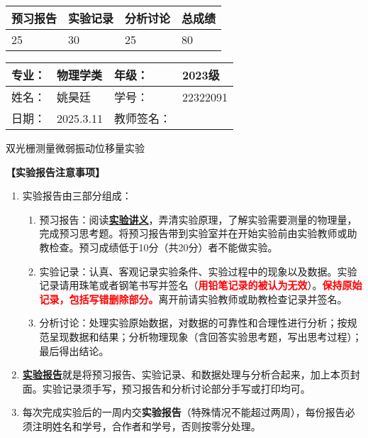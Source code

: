 \documentclass[dvipsnames, svgnames,a4paper,11pt]{article}
\newcommand{\exname}{双光栅测量微弱振动位移量实验}%
\begin{document}
\begin{table}
	\renewcommand\arraystretch{1.7}
	\begin{tabularx}{\textwidth}{
		|X|X|X|X
		|X|X|X|X|}
	\hline
	\multicolumn{2}{|c|}{预习报告}&\multicolumn{2}{|c|}{实验记录}&\multicolumn{2}{|c|}{分析讨论}&\multicolumn{2}{|c|}{总成绩}\\
	\hline
	 \hspace{0.625cm}25& & \hspace{0.625cm}30  & & \hspace{0.625cm}25  & &  \hspace{0.625cm}80 & \\
	\hline
	\end{tabularx}
\end{table}


\begin{table}
	\renewcommand\arraystretch{1.7}
	\begin{tabularx}{\textwidth}{|X|X|X|X|}
	\hline
	专业：& 物理学类 &年级：&2023级 \\
	\hline
	姓名：& 姚昊廷  & 学号：&22322091\\
	\hline
	日期：&2025.3.11 & 教师签名：& \\
	\hline
	\end{tabularx}
\end{table}

\begin{center}
	\LARGE \exname
\end{center}

\textbf{【实验报告注意事项】}
\begin{enumerate}
	\item 实验报告由三部分组成：
	\begin{enumerate}
		\item 预习报告：阅读\underline{\textbf{实验讲义}}，弄清实验原理，了解实验需要测量的物理量，完成预习思考题。将预习报告带到实验室并在开始实验前由实验教师或助教检查。预习成绩低于10分（共20分）者不能做实验。
	    \item 实验记录：认真、客观记录实验条件、实验过程中的现象以及数据。实验记录请用珠笔或者钢笔书写并签名（\textcolor{red}{\textbf{用铅笔记录的被认为无效}}）。\textcolor{red}{\textbf{保持原始记录，包括写错删除部分。}}离开前请实验教师或助教检查记录并签名。
	    \item 分析讨论：处理实验原始数据，对数据的可靠性和合理性进行分析；按规范呈现数据和结果；分析物理现象（含回答实验思考题，写出思考过程）；最后得出结论。
	\end{enumerate}
	\item \underline{\textbf{实验报告}}就是将预习报告、实验记录、和数据处理与分析合起来，加上本页封面。实验记录须手写，预习报告和分析讨论部分手写或打印均可。
	\item 每次完成实验后的一周内交\textbf{实验报告}（特殊情况不能超过两周），每份报告必须注明姓名和学号，合作者和学号，否则按零分处理。
\end{enumerate}
\end{document}
